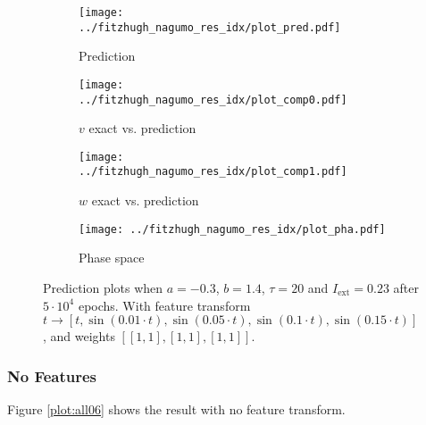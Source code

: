 \documentclass[a4paper]{article}
\begin{document}
\begin{figure}[H]
	\centering 
	\begin{subfigure}[b]{0.47\textwidth}
		\centering
		\texttt{[image: ../fitzhugh\_nagumo\_res\_idx/plot\_pred.pdf]}
		\caption{Prediction}
		\label{fig:all05a}
	\end{subfigure}
	\begin{subfigure}[b]{0.47\textwidth}
		\centering
		\texttt{[image: ../fitzhugh\_nagumo\_res\_idx/plot\_comp0.pdf]}
		\caption{$v$ exact vs. prediction}
		\label{fig:all05b}
	\end{subfigure}
	\begin{subfigure}[b]{0.47\textwidth}
		\centering
		\texttt{[image: ../fitzhugh\_nagumo\_res\_idx/plot\_comp1.pdf]}
		\caption{$w$ exact vs. prediction}
		\label{fig:all05c}
	\end{subfigure}
	\begin{subfigure}[b]{0.47\textwidth}
		\centering
		\texttt{[image: ../fitzhugh\_nagumo\_res\_idx/plot\_pha.pdf]}
		\caption{Phase space}
		\label{fig:all05d}
	\end{subfigure}
	\caption{Prediction plots when $a=-0.3$, $b=1.4$, $\tau=20$ and $ I_{\text{ext}}=0.23$ after $5\cdot10^4$ epochs. With feature transform $t \rightarrow \left[ t, \sin(0.01 \cdot  t), \sin(0.05 \cdot  t), \sin(0.1 \cdot  t), \sin(0.15 \cdot  t)\right] $, and weights $\left[ \left[ 1, 1\right], \left[ 1, 1\right], \left[ 1, 1\right]\right]$.}
	\label{plot:all05}
\end{figure} 	



\subsubsection{No Features}

Figure \ref{plot:all06} shows the result with no feature transform. 
\end{document}
